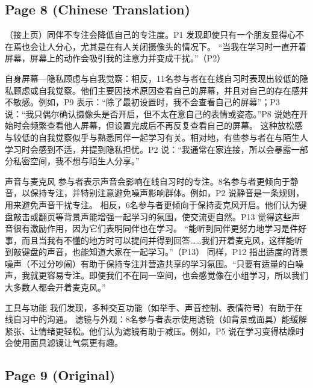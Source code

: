 \documentclass[12pt]{ctexart}
\begin{document}
\subsection*{Page 8 (Chinese Translation)}

（接上页）同伴不专注会降低自己的专注度。P1 发现即使只有一个朋友显得心不在焉也会让人分心，尤其是在有人关闭摄像头的情况下。
“当我在学习时一直开着屏幕，屏幕上的动作会吸引我的注意力并变成干扰。”（P2）

自身屏幕—隐私顾虑与自我觉察：相反，11名参与者在在线自习时表现出较低的隐私顾虑或自我觉察。他们主要因技术原因查看自己的屏幕，并且对自己的存在感并不敏感。例如，P9 表示：“除了最初设置时，我不会查看自己的屏幕”；P3 说：“我只偶尔确认摄像头是否开启，但不太在意自己的表情或姿态。”P8 说她在开始时会频繁查看他人屏幕，但设置完成后不再反复查看自己的屏幕。
这种放松感与较低的自我觉察似乎与熟悉同伴一起学习有关。相对地，有些参与者在与陌生人学习时会感到不适，并提到隐私担忧。P2 说：“我通常在家连接，所以会暴露一部分私密空间，我不想与陌生人分享。”

声音与麦克风
参与者表示声音会影响在线自习时的专注。8名参与者更倾向于静音，以保持专注，并特别注意避免噪声影响群体。例如，P2 说静音是一条规则，用来避免声音干扰专注。
相反，6名参与者更倾向于保持麦克风开启。他们认为键盘敲击或翻页等背景声能增强一起学习的氛围，使交流更自然。P13 觉得这些声音很有激励作用，因为它们表明同伴也在学习。
“能听到同伴更努力地学习是件好事，而且当我有不懂的地方时可以提问并得到回答……我们开着麦克风，这样能听到敲键盘的声音，也能知道大家在一起学习。”（P13）
同样，P12 指出适度的背景噪声（不过分吵闹）有助于保持专注并营造共享的学习氛围。“只要有适量的白噪声，我就更容易专注。即便我们不在同一空间，也会感觉像在小组学习，所以我们大多数人都会开着麦克风。”

工具与功能
我们发现，多种交互功能（如举手、声音控制、表情符号）有助于在线自习中的沟通。
滤镜与外观：8名参与者表示使用滤镜（如背景或面具）能缓解紧张、让情绪更轻松。他们认为滤镜有助于减压。例如，P5 说在学习变得枯燥时会使用面具滤镜让气氛更有趣。

\subsection*{Page 9 (Original)}
\end{document}
